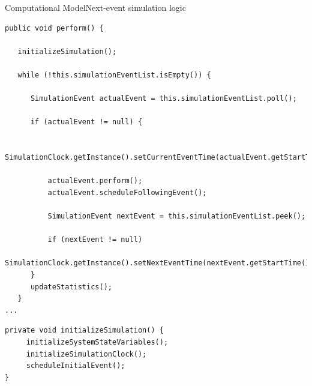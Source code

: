 \documentclass[10pt]{beamer}
\begin{document}
\begin{frame}[fragile]{Computational Model}{Next-event simulation logic}

\begin{lstlisting}[frame=lines, caption={\texttt{ComputationalModel.perform} method}]
public void perform() {

   initializeSimulation();
   
   while (!this.simulationEventList.isEmpty()) {

      SimulationEvent actualEvent = this.simulationEventList.poll();

      if (actualEvent != null) {

          SimulationClock.getInstance().setCurrentEventTime(actualEvent.getStartTime());

          actualEvent.perform();
          actualEvent.scheduleFollowingEvent();

          SimulationEvent nextEvent = this.simulationEventList.peek();

          if (nextEvent != null)
              SimulationClock.getInstance().setNextEventTime(nextEvent.getStartTime());
      }
      updateStatistics();
   }
...
\end{lstlisting}

\begin{lstlisting}[frame=lines, caption={\texttt{ComputationalModel.initializeSimulation} method}]
private void initializeSimulation() {
     initializeSystemStateVariables();
     initializeSimulationClock();
     scheduleInitialEvent();
}
\end{lstlisting}
\end{frame}
\end{document}
